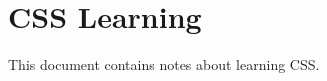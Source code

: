 \documentclass{article}
\begin{document}
\section*{CSS Learning}
This document contains notes about learning CSS.
\end{document}
